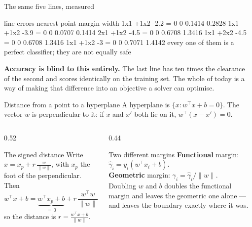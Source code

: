 \documentclass[aspectratio=169]{beamer}
\begin{document}
\begin{frame}[fragile]{The same five lines, measured}
\begin{outblk}
  line                    errors   nearest point   margin width
  1x1 +1x2 -2.2 = 0            0          0.1414         0.2828
  1x1 +1x2 -3.9 = 0            0          0.0707         0.1414
  2x1 +1x2 -4.5 = 0            0          0.6708         1.3416
  1x1 +2x2 -4.5 = 0            0          0.6708         1.3416
  1x1 +1x2 -3 = 0              0          0.7071         1.4142
every one of them is a perfect classifier; they are not equally safe
\end{outblk}
  \begin{center}\small
    \textbf{Accuracy is blind to this entirely.} The last line has ten times
    the clearance of the second and scores identically on the training set.
    The whole of today is a way of making that difference into an objective a
    solver can optimise.
  \end{center}
\end{frame}

\begin{frame}[shrink=4]{Distance from a point to a hyperplane}
  A hyperplane is $\{x : w^\top x + b = 0\}$. The vector $w$ is perpendicular
  to it: if $x$ and $x'$ both lie on it, $w^\top(x - x') = 0$.
  \begin{columns}[T]
    \begin{column}{0.52\textwidth}
      \begin{block}{The signed distance}
        Write $x = x_p + r\,\frac{w}{\|w\|}$, with $x_p$ the foot of the
        perpendicular. Then
        \[
          w^\top x + b
          = \underbrace{w^\top x_p + b}_{=\,0} + r\,\frac{w^\top w}{\|w\|}
          = r\,\|w\|,
        \]
        so the distance is
        $\displaystyle r = \frac{w^\top x + b}{\|w\|}.$
      \end{block}
    \end{column}
    \begin{column}{0.44\textwidth}
      \begin{alertblock}{Two different margins}
        \textbf{Functional} margin: $\hat\gamma_i = y_i(w^\top x_i + b)$.\\[0.3em]
        \textbf{Geometric} margin:
        $\gamma_i = \hat\gamma_i / \|w\|$.\\[0.4em]
        Doubling $w$ and $b$ doubles the functional margin and leaves the
        geometric one alone --- and leaves the boundary exactly where it was.
      \end{alertblock}
    \end{column}
  \end{columns}
\end{frame}
\end{document}
